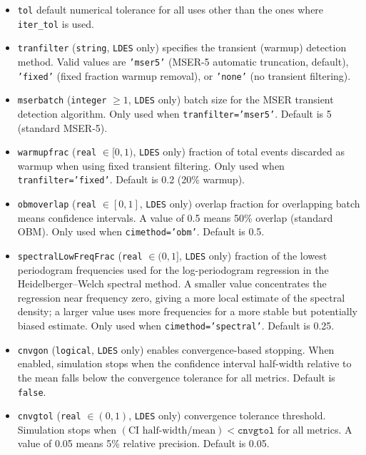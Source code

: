 \begin{itemize}
\item \texttt{tol} default numerical tolerance for all uses other than the ones where \texttt{iter\_tol} is used.

\item \texttt{tranfilter} (\texttt{string}, \texttt{LDES} only) specifies the transient (warmup) detection method. Valid values are \texttt{'mser5'} (MSER-5 automatic truncation, default), \texttt{'fixed'} (fixed fraction warmup removal), or \texttt{'none'} (no transient filtering).

\item \texttt{mserbatch} (\texttt{integer} $\geq 1$, \texttt{LDES} only) batch size for the MSER transient detection algorithm. Only used when \texttt{tranfilter='mser5'}. Default is 5 (standard MSER-5).

\item \texttt{warmupfrac} (\texttt{real} $\in [0,1)$, \texttt{LDES} only) fraction of total events discarded as warmup when using fixed transient filtering. Only used when \texttt{tranfilter='fixed'}. Default is 0.2 (20\% warmup).

\item \texttt{obmoverlap} (\texttt{real} $\in [0,1]$, \texttt{LDES} only) overlap fraction for overlapping batch means confidence intervals. A value of 0.5 means 50\% overlap (standard OBM). Only used when \texttt{cimethod='obm'}. Default is 0.5.

\item \texttt{spectralLowFreqFrac} (\texttt{real} $\in (0,1]$, \texttt{LDES} only) fraction of the lowest periodogram frequencies used for the log-periodogram regression in the Heidelberger--Welch spectral method. A smaller value concentrates the regression near frequency zero, giving a more local estimate of the spectral density; a larger value uses more frequencies for a more stable but potentially biased estimate. Only used when \texttt{cimethod='spectral'}. Default is 0.25.

\item \texttt{cnvgon} (\texttt{logical}, \texttt{LDES} only) enables convergence-based stopping. When enabled, simulation stops when the confidence interval half-width relative to the mean falls below the convergence tolerance for all metrics. Default is \texttt{false}.

\item \texttt{cnvgtol} (\texttt{real} $\in (0,1)$, \texttt{LDES} only) convergence tolerance threshold. Simulation stops when $(\text{CI half-width} / \text{mean}) < \mathtt{cnvgtol}$ for all metrics. A value of 0.05 means 5\% relative precision. Default is 0.05.


\end{itemize}
